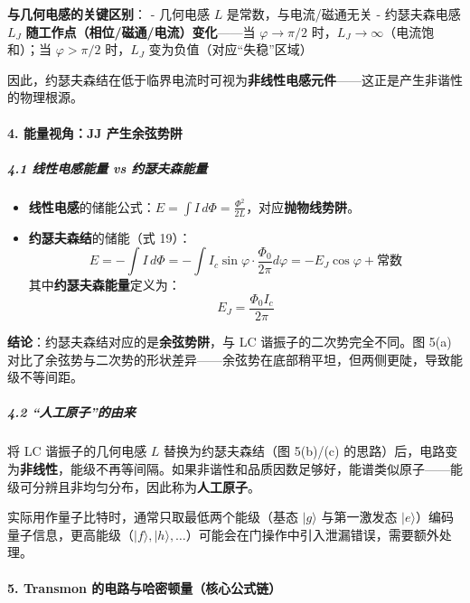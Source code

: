 \documentclass[12pt,a4paper,oneside]{ctexbook}
\providecommand{\tightlist}{%
  \setlength{\itemsep}{0pt}\setlength{\parskip}{0pt}}
\let\oldparagraph\paragraph
\renewcommand{\paragraph}[1]{\oldparagraph{#1}\mbox{}}
\let\oldsubparagraph\subparagraph
\renewcommand{\subparagraph}[1]{\oldsubparagraph{#1}\mbox{}}
\begin{document}
\textbf{与几何电感的关键区别}： - 几何电感 \(L\) 是常数，与电流/磁通无关
- 约瑟夫森电感 \(L_J\) \textbf{随工作点（相位/磁通/电流）变化}------当
\(\varphi \rightarrow \pi/2\)
时，\(L_J \rightarrow \infty\)（电流饱和）；当 \(\varphi > \pi/2\)
时，\(L_J\) 变为负值（对应``失稳''区域）

因此，约瑟夫森结在低于临界电流时可视为\textbf{非线性电感元件}------这正是产生非谐性的物理根源。


\paragraph{4. 能量视角：JJ
产生余弦势阱}\label{ux80fdux91cfux89c6ux89d2jj-ux4ea7ux751fux4f59ux5f26ux52bfux9631}

\subparagraph{4.1 线性电感能量 vs
约瑟夫森能量}\label{ux7ebfux6027ux7535ux611fux80fdux91cf-vs-ux7ea6ux745fux592bux68eeux80fdux91cf}

\begin{itemize}
\tightlist
\item
  \textbf{线性电感}的储能公式：\(E = \int I\,d\Phi = \frac{\Phi^2}{2L}\)，对应\textbf{抛物线势阱}。
\item
  \textbf{约瑟夫森结}的储能（式 19）：
  \[E = -\int I\,d\Phi = -\int I_c\sin\varphi \cdot \frac{\Phi_0}{2\pi}d\varphi = -E_J\cos\varphi + \text{常数}\]
  其中\textbf{约瑟夫森能量}定义为： \[E_J = \frac{\Phi_0 I_c}{2\pi}\]
\end{itemize}

\textbf{结论}：约瑟夫森结对应的是\textbf{余弦势阱}，与 LC
谐振子的二次势完全不同。图 5(a)
对比了余弦势与二次势的形状差异------余弦势在底部稍平坦，但两侧更陡，导致能级不等间距。

\subparagraph{4.2
``人工原子''的由来}\label{ux4ebaux5de5ux539fux5b50ux7684ux7531ux6765}

将 LC 谐振子的几何电感 \(L\) 替换为约瑟夫森结（图 5(b)/(c)
的思路）后，电路变为\textbf{非线性}，能级不再等间隔。如果非谐性和品质因数足够好，能谱类似原子------能级可分辨且非均匀分布，因此称为\textbf{人工原子}。

实际用作量子比特时，通常只取最低两个能级（基态 \(|g\rangle\)
与第一激发态
\(|e\rangle\)）编码量子信息，更高能级（\(|f\rangle, |h\rangle, \dots\)）可能会在门操作中引入泄漏错误，需要额外处理。


\paragraph{5. Transmon
的电路与哈密顿量（核心公式链）}\label{transmon-ux7684ux7535ux8defux4e0eux54c8ux5bc6ux987fux91cfux6838ux5fc3ux516cux5f0fux94fe}
\end{document}
